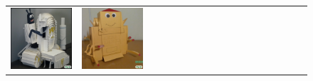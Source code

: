 \begin{figure}[ht!]
\begin{adjustwidth}{-0.8in}{-0.5in}
\begin{tabular}{cccccccccccccccccccc}
\multicolumn{2}{c}{\includegraphics[width=\threebythreecolwidth\textwidth]{figures/cherries/paper1.jpg}} &
\multicolumn{2}{c}{\includegraphics[width=\threebythreecolwidth\textwidth]{figures/cherries/paper2.jpg}} &

\end{tabular}
\end{adjustwidth}
\end{figure}
